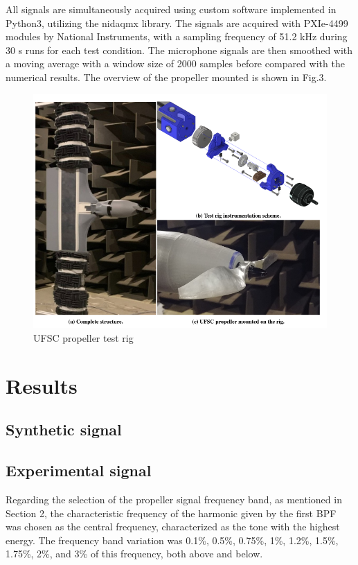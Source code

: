 \documentclass[10pt,fleqn,a4paper,twoside]{article}
\begin{document}
All signals are simultaneously acquired using custom software implemented in Python3, utilizing the nidaqmx
library. The signals are acquired with PXIe-4499 modules by National Instruments, with a sampling frequency of 51.2 kHz during 30 s runs for each test condition\citep{Augusto}. The microphone signals are then smoothed with a moving average with a window size of 2000 samples before compared with the numerical results. The overview of the propeller mounted is shown in Fig.3.
\begin{figure}[h!]
    \centering
    \includegraphics[angle=0, scale=0.320]{Figures/UFSC_propeller_test_rig.png}
    \caption{UFSC propeller test rig}
    \label{fig3}
    \end{figure}
\section{Results}
\subsection{Synthetic signal}
\subsection{Experimental signal}
Regarding the selection of the propeller signal frequency band, as mentioned in Section 2, the characteristic frequency of the harmonic given by the first BPF was chosen as the central frequency, characterized as the tone with the highest energy. The frequency band variation was 0.1\%, 0.5\%, 0.75\%, 1\%, 1.2\%, 1.5\%, 1.75\%, 2\%, and 3\% of this frequency, both above and below. 
\end{document}
